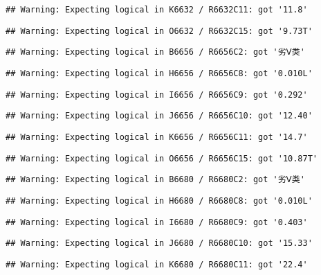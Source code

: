 \documentclass[
]{article}
\begin{document}
\begin{verbatim}
## Warning: Expecting logical in K6632 / R6632C11: got '11.8'
\end{verbatim}

\begin{verbatim}
## Warning: Expecting logical in O6632 / R6632C15: got '9.73T'
\end{verbatim}

\begin{verbatim}
## Warning: Expecting logical in B6656 / R6656C2: got '劣Ⅴ类'
\end{verbatim}

\begin{verbatim}
## Warning: Expecting logical in H6656 / R6656C8: got '0.010L'
\end{verbatim}

\begin{verbatim}
## Warning: Expecting logical in I6656 / R6656C9: got '0.292'
\end{verbatim}

\begin{verbatim}
## Warning: Expecting logical in J6656 / R6656C10: got '12.40'
\end{verbatim}

\begin{verbatim}
## Warning: Expecting logical in K6656 / R6656C11: got '14.7'
\end{verbatim}

\begin{verbatim}
## Warning: Expecting logical in O6656 / R6656C15: got '10.87T'
\end{verbatim}

\begin{verbatim}
## Warning: Expecting logical in B6680 / R6680C2: got '劣Ⅴ类'
\end{verbatim}

\begin{verbatim}
## Warning: Expecting logical in H6680 / R6680C8: got '0.010L'
\end{verbatim}

\begin{verbatim}
## Warning: Expecting logical in I6680 / R6680C9: got '0.403'
\end{verbatim}

\begin{verbatim}
## Warning: Expecting logical in J6680 / R6680C10: got '15.33'
\end{verbatim}

\begin{verbatim}
## Warning: Expecting logical in K6680 / R6680C11: got '22.4'
\end{verbatim}
\end{document}
